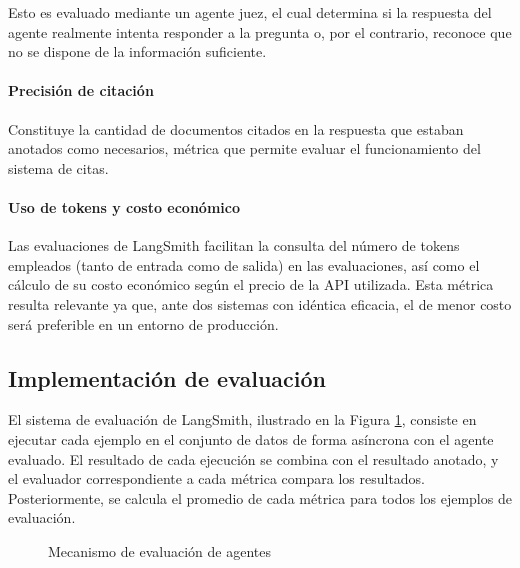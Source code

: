 Esto es evaluado mediante un agente juez, el cual determina si la respuesta del agente realmente intenta responder a la pregunta o, por el contrario, reconoce que no se dispone de la información suficiente.

\paragraph{Precisión de citación} Constituye la cantidad de documentos citados en la respuesta que estaban anotados como necesarios, métrica que permite evaluar el funcionamiento del sistema de citas.

\paragraph{Uso de tokens y costo económico} Las evaluaciones de LangSmith facilitan la consulta del número de tokens empleados (tanto de entrada como de salida) en las evaluaciones, así como el cálculo de su costo económico según el precio de la API utilizada. Esta métrica resulta relevante ya que, ante dos sistemas con idéntica eficacia, el de menor costo será preferible en un entorno de producción.

\subsection{Implementación de evaluación}
\label{sec:langsmith}
El sistema de evaluación de LangSmith, ilustrado en la Figura \ref{fig:mem_1}, consiste en ejecutar cada ejemplo en el conjunto de datos de forma asíncrona con el agente evaluado. El resultado de cada ejecución se combina con el resultado anotado, y el evaluador correspondiente a cada métrica compara los resultados. Posteriormente, se calcula el promedio de cada métrica para todos los ejemplos de evaluación.

\begin{figure}[h]
\centering
{}
\caption{Mecanismo de evaluación de agentes}
\label{fig:mem_1}
\end{figure}


